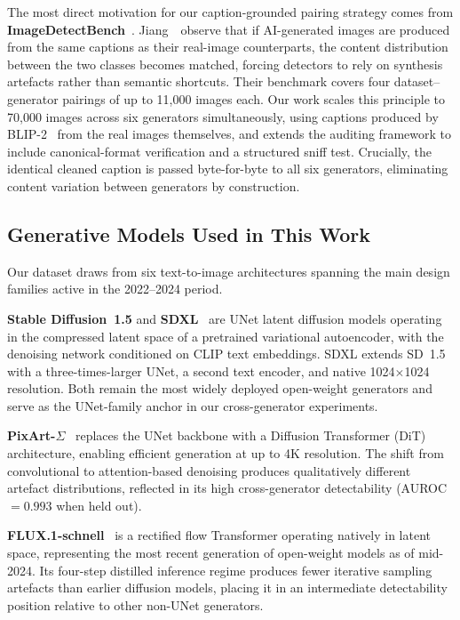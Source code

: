 The most direct motivation for our caption-grounded pairing strategy
comes from \textbf{ImageDetectBench}~\cite{jiang2024passive}.
Jiang~\etal\ observe that if AI-generated images are produced from
the same captions as their real-image counterparts, the content
distribution between the two classes becomes matched, forcing
detectors to rely on synthesis artefacts rather than semantic
shortcuts.
Their benchmark covers four dataset--generator pairings of up to
11{,}000 images each.
Our work scales this principle to 70{,}000 images across six
generators simultaneously, using captions produced by
BLIP-2~\cite{li2023blip2} from the real images themselves, and
extends the auditing framework to include canonical-format
verification and a structured sniff test.
Crucially, the identical cleaned caption is passed byte-for-byte
to all six generators, eliminating content variation between
generators by construction.

\subsection{Generative Models Used in This Work}
\label{ssec:generators}

Our dataset draws from six text-to-image architectures spanning
the main design families active in the 2022--2024 period.

\textbf{Stable Diffusion~1.5} and \textbf{SDXL}~\cite{rombach2022ldm,podell2024sdxl}
are UNet latent diffusion models operating in the compressed
latent space of a pretrained variational autoencoder, with the
denoising network conditioned on CLIP text embeddings.
SDXL extends SD~1.5 with a three-times-larger UNet, a second text
encoder, and native 1024$\times$1024 resolution.
Both remain the most widely deployed open-weight generators and
serve as the UNet-family anchor in our cross-generator experiments.

\textbf{PixArt-$\Sigma$}~\cite{chen2024pixart} replaces the UNet
backbone with a Diffusion Transformer (DiT) architecture, enabling
efficient generation at up to 4K resolution.
The shift from convolutional to attention-based denoising produces
qualitatively different artefact distributions, reflected in its
high cross-generator detectability (AUROC~$= 0.993$ when held out).

\textbf{FLUX.1-schnell}~\cite{flux2024bfl} is a rectified flow
Transformer operating natively in latent space, representing the
most recent generation of open-weight models as of mid-2024.
Its four-step distilled inference regime produces fewer iterative
sampling artefacts than earlier diffusion models, placing it in
an intermediate detectability position relative to other non-UNet
generators.

